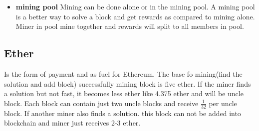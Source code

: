 \begin{itemize}
    \item \textbf{mining pool}
     Mining can be done alone or in the mining pool. A mining pool is a better way to solve a block and get rewards as compared to mining alone. Miner in pool mine together and rewards will split to all members in pool\cite{Egbertsen}.
\end{itemize}
\subsection{Ether}
 Is the form of payment and as fuel for Ethereum. The base fo mining(find the solution and add block) successfully mining block is five ether. If the miner finds a solution but not fast, it becomes less ether like 4.375 ether and will be uncle block. Each block can contain just two uncle blocks and receive $\frac{1}{32}$ per uncle block. If another miner also finds a solution. this block can not be added into blockchain and miner just receives 2-3 ether\cite{Egbertsen}. 
